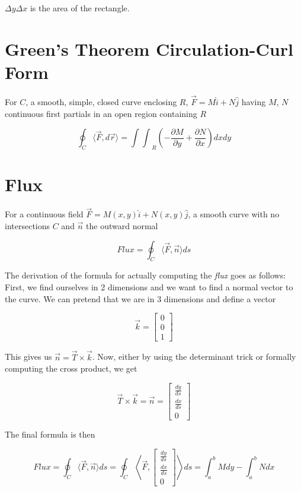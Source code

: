 \(\Delta y \Delta x\) is the area of the rectangle.

\section{Green's Theorem Circulation-Curl Form}

For \(C\), a smooth, simple, closed curve enclosing \(R\), \(\vec{F} = M \hat{i} + N \hat{j}\) having \(M\), \(N\) continuous first partials in an open region 
containing \(R\)

\[
    \oint_C \langle \vec{F}, d \vec{r} \rangle = {\int\int}_{R}  
    \left(-\frac{\partial M}{\partial y} + \frac{\partial N}{\partial x}\right) dx dy  
\]

\section{Flux}

For a continuous field \(\vec{F} = M(x,y)\hat{i} + N(x,y)\hat{j}\), a smooth curve with no intersections \(C\) and \(\vec{n}\) the outward normal 

\[
    Flux = \oint_C \langle \vec{F}, \vec{n} \rangle ds
\]

The derivation of the formula for actually computing the \emph{flux} goes as follows: First, we find ourselves in 2 dimensions 
and we want to find a normal vector to the curve. We can pretend that we are in 3 dimensions and define a vector 

\[
    \vec{k} = \begin{bmatrix} 0 \\ 0 \\ 1 \end{bmatrix}
\] 

This gives us \(\vec{n} = \vec{T} \times \vec{k}\). Now, either by using the determinant trick or formally computing the cross product, we get 

\[
    \vec{T} \times \vec{k} = \vec{n} = \begin{bmatrix} \frac{dy}{ds} \\ \frac{dx}{ds} \\ 0 \end{bmatrix}
\]

The final formula is then 

\[
    Flux = \oint_C \langle \vec{F}, \vec{n} \rangle ds = \oint_C \left\langle \vec{F}, \begin{bmatrix} \frac{dy}{ds} \\ \frac{dx}{ds} \\ 0 \end{bmatrix} \right\rangle ds = 
    \int_{a}^{b} M dy - \int_{a}^{b} N dx
\]

